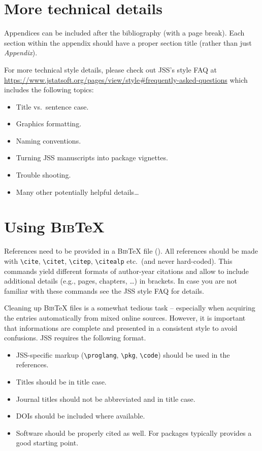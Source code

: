 \documentclass[article]{jss}\usepackage{knitr}
\begin{document}
\begin{appendix}

\section{More technical details} \label{app:technical}

\begin{leftbar}
Appendices can be included after the bibliography (with a page break). Each
section within the appendix should have a proper section title (rather than
just \emph{Appendix}).

For more technical style details, please check out JSS's style FAQ at
\url{https://www.jstatsoft.org/pages/view/style#frequently-asked-questions}
which includes the following topics:
\begin{itemize}
\item Title vs.\ sentence case.
\item Graphics formatting.
\item Naming conventions.
\item Turning JSS manuscripts into  package vignettes.
\item Trouble shooting.
\item Many other potentially helpful details\dots
\end{itemize}
\end{leftbar}


\section[Using BibTeX]{Using \textsc{Bib}{\TeX}} \label{app:bibtex}

\begin{leftbar}
References need to be provided in a \textsc{Bib}{\TeX} file (). All
references should be made with \verb|\cite|, \verb|\citet|, \verb|\citep|,
\verb|\citealp| etc.\ (and never hard-coded). This commands yield different
formats of author-year citations and allow to include additional details (e.g.,
pages, chapters, \dots) in brackets. In case you are not familiar with these
commands see the JSS style FAQ for details.

Cleaning up \textsc{Bib}{\TeX} files is a somewhat tedious task -- especially
when acquiring the entries automatically from mixed online sources. However,
it is important that informations are complete and presented in a consistent
style to avoid confusions. JSS requires the following format.
\begin{itemize}
\item JSS-specific markup (\verb|\proglang|, \verb|\pkg|, \verb|\code|) should
be used in the references.
\item Titles should be in title case.
\item Journal titles should not be abbreviated and in title case.
\item DOIs should be included where available.
\item Software should be properly cited as well. For  packages
 typically provides a good starting point.
\end{itemize}
\end{leftbar}

\end{appendix}

\end{document}
